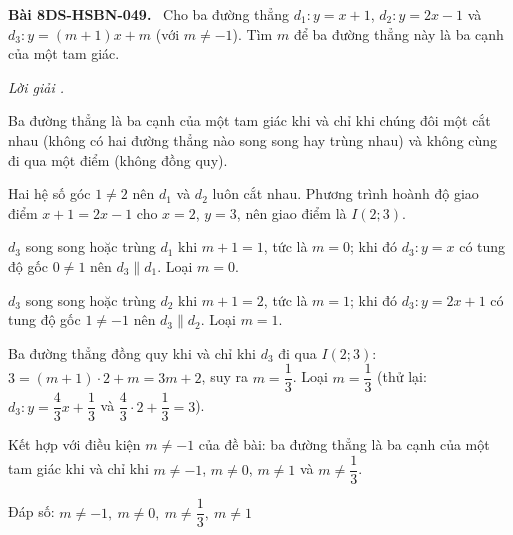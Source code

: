 \documentclass[12pt,a4paper]{article}
\newenvironment{problem}[1][]{\par\medskip\noindent\textbf{Bài #1.}\ }{\par}
\newenvironment{solution}[1][]{\par\noindent\textit{Lời giải #1.}\par}{\par}
\begin{document}
\begin{problem}[8DS-HSBN-049]
Cho ba đường thẳng $d_1\colon y = x + 1$, $d_2\colon y = 2x - 1$ và $d_3\colon y = (m + 1)x + m$ (với $m \neq -1$). Tìm $m$ để ba đường thẳng này là ba cạnh của một tam giác.

\begin{solution}
Ba đường thẳng là ba cạnh của một tam giác khi và chỉ khi chúng đôi một cắt nhau (không có hai đường thẳng nào song song hay trùng nhau) và không cùng đi qua một điểm (không đồng quy).

Hai hệ số góc $1 \neq 2$ nên $d_1$ và $d_2$ luôn cắt nhau. Phương trình hoành độ giao điểm $x + 1 = 2x - 1$ cho $x = 2$, $y = 3$, nên giao điểm là $I(2; 3)$.

$d_3$ song song hoặc trùng $d_1$ khi $m + 1 = 1$, tức là $m = 0$; khi đó $d_3\colon y = x$ có tung độ gốc $0 \neq 1$ nên $d_3 \parallel d_1$. Loại $m = 0$.

$d_3$ song song hoặc trùng $d_2$ khi $m + 1 = 2$, tức là $m = 1$; khi đó $d_3\colon y = 2x + 1$ có tung độ gốc $1 \neq -1$ nên $d_3 \parallel d_2$. Loại $m = 1$.

Ba đường thẳng đồng quy khi và chỉ khi $d_3$ đi qua $I(2; 3)$: $3 = (m + 1) \cdot 2 + m = 3m + 2$, suy ra $m = \dfrac{1}{3}$. Loại $m = \dfrac{1}{3}$ (thử lại: $d_3\colon y = \dfrac{4}{3}x + \dfrac{1}{3}$ và $\dfrac{4}{3} \cdot 2 + \dfrac{1}{3} = 3$).

Kết hợp với điều kiện $m \neq -1$ của đề bài: ba đường thẳng là ba cạnh của một tam giác khi và chỉ khi $m \neq -1$, $m \neq 0$, $m \neq 1$ và $m \neq \dfrac{1}{3}$.

Đáp số: $\boxed{m \neq -1,\ m \neq 0,\ m \neq \dfrac{1}{3},\ m \neq 1}$
\end{solution}
\end{problem}
\end{document}
